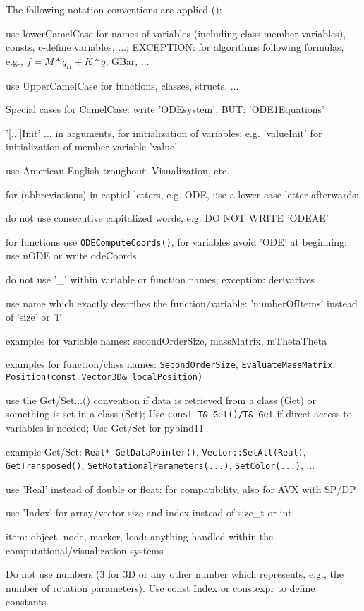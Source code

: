%
The following notation conventions are applied ():
\bi
    \item use lowerCamelCase for names of variables (including class member variables), consts, c-define variables, ...; EXCEPTION: for algorithms following formulas, e.g., $f = M*q_{tt} + K*q$, GBar, ...
    \item use UpperCamelCase for functions, classes, structs, ...
    \item Special cases for CamelCase: write 'ODEsystem', BUT: 'ODE1Equations'
    \item '[...]Init' ... in arguments, for initialization of variables; e.g. 'valueInit' for initialization of member variable 'value'
    \item use American English troughout: Visualization, etc.
    \item for (abbreviations) in captial letters, e.g. ODE, use a lower case letter afterwards:
    \item do not use consecutive capitalized words, e.g. DO NOT WRITE 'ODEAE'
    \item for functions use \texttt{ODEComputeCoords()}, for variables avoid 'ODE' at beginning: use nODE or write odeCoords
    \item do not use '\_' within variable or function names; exception: derivatives
    \item use name which exactly describes the function/variable: 'numberOfItems' instead of 'size' or 'l'
    \item examples for variable names: secondOrderSize, massMatrix, mThetaTheta
    \item examples for function/class names: \texttt{SecondOrderSize}, \texttt{EvaluateMassMatrix}, \texttt{Position(const Vector3D\& localPosition)}
    \item use the Get/Set...() convention if data is retrieved from a class (Get) or something is set in a class (Set); Use \texttt{const T\& Get()/T\& Get} if direct access to variables is needed; Use Get/Set for pybind11
    \item example Get/Set: \texttt{Real* GetDataPointer()}, \texttt{Vector::SetAll(Real)}, \texttt{GetTransposed()}, \texttt{SetRotationalParameters(...)}, \texttt{SetColor(...)}, ...
    \item use 'Real' instead of double or float: for compatibility, also for AVX with SP/DP
    \item use 'Index' for array/vector size and index instead of size\_t or int
    \item item: object, node, marker, load: anything handled within the computational/visualization systems
    \item Do not use numbers (3 for 3D or any other number which represents, e.g., the number of rotation parameters). Use const Index or constexpr to define constants.
\ei

